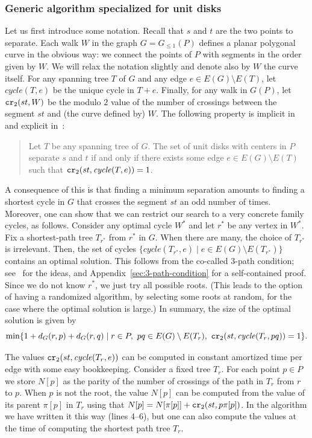 \documentclass[a4paper,USenglish]{lipics}
\newcommand{\GG}{\ensuremath{G_{\le 1}}}
\newcommand{\cycle}{\mathit{cycle}}
\newcommand\CR{\mbox{\tt cr}_2}		  %
\let\le\leqslant
\begin{document}
\subsubsection{Generic algorithm specialized for unit disks}
\label{sec:generic}
Let us first introduce some notation.
Recall that $s$ and $t$ are the two points to separate.
Each walk $W$ in the graph $G=\GG(P)$ defines a planar polygonal curve
in the obvious way: we connect the points of $P$ 
with segments in the order given by $W$. 
We will relax the notation slightly and denote also by $W$ the curve itself.
For any spanning tree $T$ of $G$ and any edge $e\in E(G)\setminus E(T)$, 
let $\cycle(T,e)$ be the unique cycle in $T+e$.
Finally, for any walk in $G(P)$, let $\CR (st,W)$ be the 
modulo $2$ value of the number of crossings between the segment $st$ 
and (the curve defined by) $W$.
The following property is implicit in~\cite{CG16} and explicit in~\cite{CK15}:
\begin{quote}
	Let $T$ be any spanning tree of $G$.
	The set of unit disks with centers in $P$ separate $s$ and $t$ if and only
	if there exists some edge $e\in E(G)\setminus E(T)$ 
	such that $\CR (st, \cycle(T,e))=1$.
\end{quote}

A consequence of this is that finding a minimum separation amounts 
to finding a shortest cycle in $G$ that crosses the segment $st$ an odd number of times.
Moreover, one can show that we can restrict our search to 
a very concrete family cycles, as follows. 
Consider any optimal cycle $W^*$ and let $r^*$ be any vertex in $W^*$.
Fix a shortest-path tree $T_{r^*}$ from $r^*$ in $G$.
When there are many, the choice of $T_{r^*}$ is irrelevant. 
Then, the set of cycles $\{ \cycle(T_{r^*},e)\mid e\in E(G)\setminus E(T_{r^*})\}$
contains an optimal solution.
This follows from the co-called 3-path condition; 
see~\cite{CG16} for the ideas, and Appendix~\ref{sec:3-path-condition} 
for a self-contained proof. Since we do not know $r^*$, we just try all
possible roots. (This leads to the option of having a randomized algorithm,
by selecting some roots at random, for the case where the optimal solution is large.)
In summary, the size of the optimal solution is given by
\[
	\min \{ 1+d_G(r,p)+d_G(r,q) \mid
		r\in P,~ pq\in E(G)\setminus E(T_r),~
		\CR(st,\cycle(T_{r},pq))=1 \} .
\]

The values $\CR (st, \cycle(T_r,e))$ can be computed in constant amortized time per edge
with some easy bookkeeping. Consider a fixed tree $T_r$.
For each point $p\in P$ we store $N[p]$ as the parity of the number of crossings
of the path in $T_r$ from $r$ to $p$. When $p$ is not the root,
the value $N[p]$ can be computed from the value of its parent $\pi[p]$ in $T_r$
using that $N[p]=N[\pi[p]]+\CR(st,p\pi[p])$.
In the algorithm we have written it this way (lines 4--6), but
one can also compute the values at the time of computing the shortest path tree $T_r$.
\end{document}
